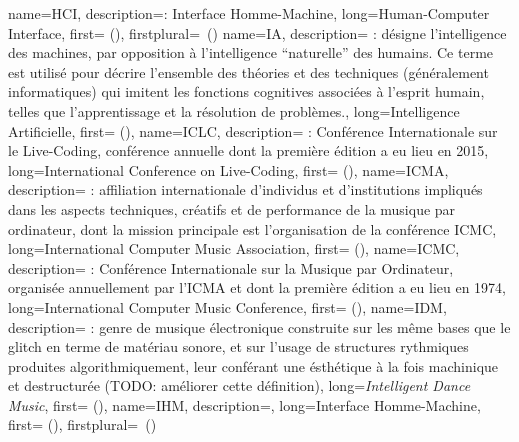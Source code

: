{
    name={HCI},
    description={\textit{}: Interface Homme-Machine},
    long={Human-Computer Interface},
    first={} (),
    firstplural={\glspluralsuffix\ (\glspluralsuffix)}
}
{
    name={IA},
    description={\textit{} : désigne l'intelligence des machines, par opposition à l'intelligence ``naturelle'' des humains. Ce terme est utilisé pour décrire l'ensemble des théories et des techniques (généralement informatiques) qui imitent les fonctions cognitives associées à l'esprit humain, telles que l'apprentissage et la résolution de problèmes.},
    long={Intelligence Artificielle},
    first={} (),
}
{
    name={ICLC},
    description={\textit{} : Conférence Internationale sur le Live-Coding, conférence annuelle dont la première édition a eu lieu en 2015},
    long={International Conference on Live-Coding},
    first={} (),
}
{
    name={ICMA},
    description={\textit{} : affiliation internationale d'individus et d'institutions impliqués dans les aspects techniques, créatifs et de performance de la musique par ordinateur, dont la mission principale est l'organisation de la conférence \gls{ICMC}},
    long={International Computer Music Association},
    first={} (),
}
{
    name={ICMC},
    description={\textit{} : Conférence Internationale sur la Musique par Ordinateur, organisée annuellement par l'\gls{ICMA} et dont la première édition a eu lieu en 1974},
    long={International Computer Music Conference},
    first={} (),
}
{
    name={IDM},
    description={\textit{} : genre de musique électronique construite sur les même bases que le \gls{glitch} en terme de matériau sonore, et sur l'usage de structures rythmiques produites algorithmiquement, leur conférant une ésthétique à la fois machinique et destructurée (TODO: améliorer cette définition)},
    long={\textit{Intelligent Dance Music}},
    first={} (),
}
{
    name={IHM},
    description={\textit{}},
    long={Interface Homme-Machine},
    first={} (),
    firstplural={\glspluralsuffix\ (\glspluralsuffix)}
}
